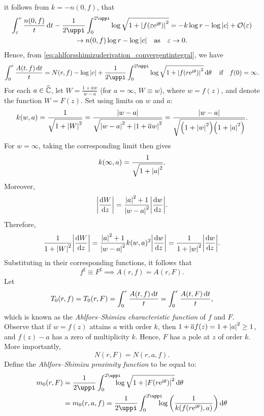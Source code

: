 it follows from \(k=-n(0,f)\), that
\begin{multline*}
    \int_\varepsilon^r\frac{n(0,f)}t\ddt-\frac1{2\uppi}\int_0^{2\uppi}\log\sqrt{1+\abs{f\qty(\varepsilon\ee^{\ii\theta})}^2}=-k\log r-\log\abs{c}+\order{\varepsilon}\\\to n(0,f)\log r-\log\abs{c}\qq{as}\varepsilon\to 0.
\end{multline*}
Hence, from \cref{eq:ahlforsshimizuderivation_convergentintegral}, we have
\begin{equation}
    \int_0^r\frac{A(t,f)\ddt}t=N(r,f)-\log\abs{c}+\frac1{2\uppi}\int_0^{2\uppi}\log\sqrt{1+\abs{f\qty(r\ee^{\ii\theta})}^2}\dd{\theta}\qif f(0)=\infty.\label{eq:ahlforsshimizuderivation_singularcase}
\end{equation}
For each \(a\in\widehat{\mathbb{C}}\), let \(W=\tfrac{1+\overline{a}w}{w-a}\) (for \(a=\infty\), \(W\equiv w\)), where \(w=f(z)\), and denote the function \(W=F(z)\). Set using limits on \(w\) and \(a\): \[k(w,a)=\frac1{\sqrt{1+\abs{W}^2}}=\frac{\abs{w-a}}{\sqrt{\abs{w-a}^2+\abs{1+\overline{a}w}^2}}=\frac{\abs{w-a}}{\sqrt{\qty(1+\abs{w}^2)\qty(1+\abs{a}^2)}}.\] For \(w=\infty\), taking the corresponding limit then gives
\[k(\infty,a)=\frac{1}{\sqrt{1+\abs{a}^2}}.\]
Moreover, \[\abs{\dv{W}{z}}=\frac{\abs{a}^2+1}{\abs{w-a}^2}\abs{\dv{w}{z}}.\]
Therefore, \[\frac{1}{1+\abs{W}^2}\abs{\dv{W}{z}}=\frac{\abs{a}^2+1}{\abs{w-a}^2}k(w,a)^2\abs{\dv{w}{z}}=\frac{1}{1+\abs{w}^2}\abs{\dv{w}{z}}.\]
Substituting in their corresponding functions, it follows that \[f^\sharp\equiv F^\sharp\implies A(r,f)=A(r,F).\]
Let \[T_0(r,f)=T_0(r,F)=\int_0^r\frac{A(t,f)\dd{t}}t=\int_0^r \frac{A(t,F)\dd{t}}t,\] which is known as the \textit{Ahlfors--Shimizu characteristic function} of \(f\) and \(F\).
Observe that if \(w=f(z)\) attains \(a\) with order \(k\), then \(1+\overline{a}f(z)=1+\abs{a}^2\geq 1\), and \(f(z)-a\) has a zero of multiplicity \(k\). Hence, \(F\) has a pole at \(z\) of order \(k\). More importantly,
\begin{equation}
    N(r,F)=N(r,a,f).\label{eq:ahlforsshimizuriemannsphererotationcountingfunction}
\end{equation}
Define the \textit{Ahlfors--Shimizu proximity function} to be equal to:
\begin{align}
    m_0(r,F)&=\frac1{2\uppi}\mathop{\mathmakebox[\widthof{\(\int_{\uppi}\)}][l]{\int_0^{2\uppi}}}\log\sqrt{1+\abs{F\qty(r\ee^{\ii\theta})}^2}\dd{\theta}\nonumber\\
    &=m_0(r,a,f)=\frac1{2\uppi}\mathop{\mathmakebox[\widthof{\(\int^{\uppi}\)}][l]{\int_0^{2\uppi}}}\log\qty(\frac1{k\qty(f\qty(r\ee^{\ii\theta}),a)})\dd{\theta}\label{eq:ahlforsshimizuproximity}
\end{align}
